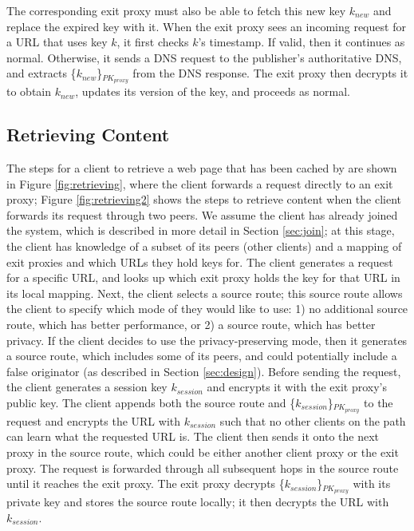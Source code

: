 The corresponding exit proxy must also be able to fetch this new key $k_{new}$ and replace the expired key with it.  When the exit proxy 
sees an incoming request for a URL that uses key $k$, it first checks $k$'s timestamp.  If valid, then it continues as normal.  Otherwise, 
it sends a DNS request to the publisher's authoritative DNS, and extracts \{$k_
{new}$\}$_{PK_{proxy}}$ from the DNS response.  The exit 
proxy then decrypts it to obtain $k_{new}$, updates its version of the key, and
proceeds as normal.



\subsection{Retrieving Content}
\label{sec:retrieve}
The steps for a client to retrieve a web page that has been cached by \system{} are shown in Figure \ref{fig:retrieving}, where the client 
forwards a request directly to an exit proxy; Figure \ref{fig:retrieving2} shows
the steps to retrieve content when the client forwards its
request through two peers. We assume the client has already joined the system, which is described in more detail in Section \ref{sec:join}; at this 
stage, the client has knowledge of a subset of its peers (other \system{} clients) and a mapping of exit proxies and which URLs they hold 
keys for.  The client generates a request for a specific URL, and looks up which exit proxy holds the key for that URL in its local mapping.  Next, 
the client selects a source route; this source route allows the client to specify which mode of \system{} they would like to use: 1) no additional source 
route, which has better performance, or 2) a source route, which has better privacy.  If the client decides to use the privacy-preserving mode, 
then it generates a source route, which includes some of its peers, and could potentially
include a false originator (as described in Section \ref{sec:design}).
Before sending the request, the client generates a session key $k_{session}$ and encrypts it with the exit proxy's public key.  The client appends both the source route and \{$k_{session}$\}$_{PK_{proxy}}$ to the request and encrypts the URL with $k_{session}$ such that no other clients on the path can learn what the requested URL is.  The client then sends it onto the next proxy in the source route, which could be either another client proxy or the exit proxy.  The request is forwarded 
through all subsequent hops in the source route until it reaches the exit proxy.  The exit proxy decrypts \{$k_{session}$\}$_{PK_{proxy}}$ with its private key and stores 
the source route locally; it then decrypts the URL with $k_{session}$. 

